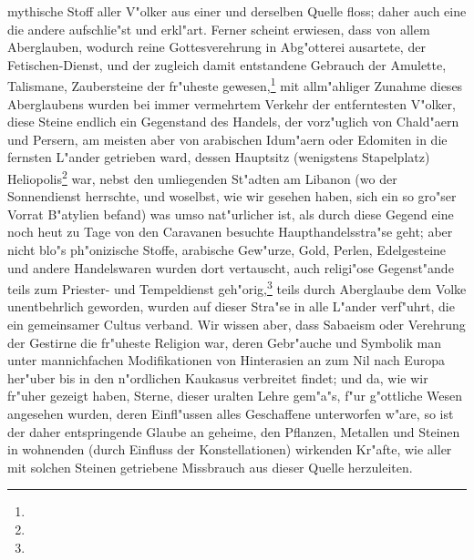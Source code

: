 \documentclass[a4paper, 11pt, oneside, polutonikogreek, german]{article}
\begin{document}
mythische Stoff aller V"olker aus einer und derselben Quelle floss; daher auch eine die andere aufschlie"st und erkl"art. Ferner scheint erwiesen, dass von allem Aberglauben, wodurch reine Gottesverehrung in Abg"otterei ausartete, der Fetischen-Dienst, und der zugleich damit entstandene Gebrauch der Amulette, Talismane, Zaubersteine der fr"uheste gewesen,\footnote{} mit allm"ahliger Zunahme dieses Aberglaubens wurden bei immer vermehrtem Verkehr der entferntesten V"olker, diese Steine endlich ein Gegenstand des Handels, der vorz"uglich von Chald"aern und Persern, am meisten aber von arabischen Idum"aern oder Edomiten in die fernsten L"ander getrieben ward, dessen Hauptsitz (wenigstens Stapelplatz) Heliopolis\footnote{} war, nebst den umliegenden St"adten am Libanon (wo der Sonnendienst herrschte, und woselbst, wie wir gesehen haben, sich ein so gro"ser Vorrat B"atylien befand) was umso nat"urlicher ist, als durch diese Gegend eine noch heut zu Tage von den Caravanen besuchte Haupthandelsstra"se geht; aber nicht blo"s ph"onizische Stoffe, arabische Gew"urze, Gold, Perlen, Edelgesteine und andere Handelswaren wurden dort vertauscht, auch religi"ose Gegenst"ande teils zum Priester- und Tempeldienst geh"orig,\footnote{} teils durch Aberglaube dem Volke unentbehrlich geworden, wurden auf dieser Stra"se in alle L"ander verf"uhrt, die ein gemeinsamer Cultus verband. Wir wissen aber, dass Sabaeism oder Verehrung der Gestirne die fr"uheste Religion war, deren Gebr"auche und Symbolik man unter mannichfachen Modifikationen von Hinterasien an zum Nil nach Europa her"uber bis in den n"ordlichen Kaukasus verbreitet findet; und da, wie wir fr"uher gezeigt haben, Sterne, dieser uralten Lehre gem"a"s, f"ur g"ottliche Wesen angesehen wurden, deren Einfl"ussen alles Geschaffene unterworfen w"are, so ist der daher entspringende Glaube an geheime, den Pflanzen, Metallen und Steinen in wohnenden (durch Einfluss der Konstellationen) wirkenden Kr"afte, wie aller mit solchen Steinen getriebene Missbrauch aus dieser Quelle herzuleiten.
\end{document}
